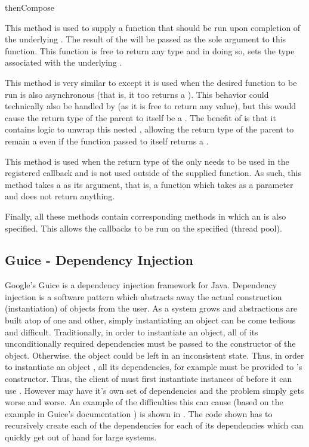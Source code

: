\begin{labeling}{thenCompose}
	\item [thenApply] This method is used to supply a function that should be run upon completion of the underlying . The result of the  will be passed as the sole argument to this function. This function is free to return any type and in doing so, sets the type associated with the underlying . 
	\item [thenCompose] This method is very similar to  except it is used when the desired function to be run is also asynchronous (that is, it too returns a ). This behavior could technically also be handled by  (as it is free to return any value), but this would cause the return type of the parent  to itself be a . The benefit of  is that it contains logic to unwrap this nested , allowing the return type of the parent to remain a  even if the function passed to  itself returns a .
	\item [thenAccept] This method is used when the return type of the  only needs to be used in the registered callback and is not used outside of the supplied function. As such, this method takes a  as its argument, that is, a function which takes  as a parameter and does not return anything.  
\end{labeling}

Finally, all these methods contain corresponding methods in which an  is also specified. This allows the callbacks to be run on the specified  (thread pool).


\subsection{Guice - Dependency Injection}\label{sec:guice}
Google's Guice \cite{guice} is a dependency injection framework for Java. Dependency injection is a software pattern which abstracts away the actual construction (instantiation) of objects from the user. As a system grows and abstractions are built atop of one and other, simply instantiating an object can be come tedious and difficult. Traditionally, in order to instantiate an object, all of its unconditionally required dependencies must be passed to the constructor of the object. Otherwise. the object could be left in an inconsistent state. Thus, in order to instantiate an object , all its dependencies, for example  must be provided to 's constructor. Thus, the client of  must first instantiate instances of  before it can use . However  may have it's own set of dependencies and the problem simply gets worse and worse. An example of the difficulties this can cause (based on the example in Guice's documentation \cite{guiceDocs}) is shown in . The code shown has to recursively create each of the dependencies for each of its dependencies which can quickly get out of hand for large systems.

